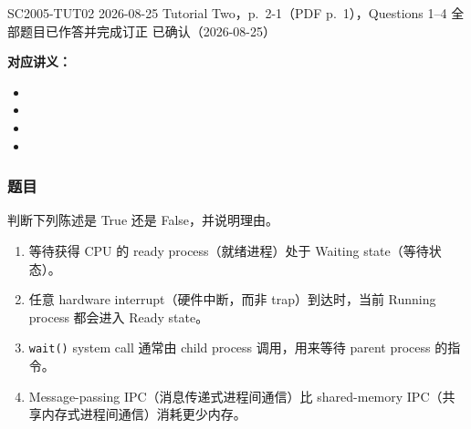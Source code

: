 
\label{tutorial:SC2005-TUT02}

\tutorialmeta
  {SC2005-TUT02}
  {2026-08-25}
  {Tutorial Two，p.~2-1（PDF p.~1），Questions 1--4}
  {全部题目已作答并完成订正}
  {已确认（2026-08-25）}


\textbf{对应讲义：}
\begin{itemize}[leftmargin=2em]
  \item {}
  \item {}
  \item {}
  \item {}
\end{itemize}

\subsubsection*{题目}

判断下列陈述是 True 还是 False，并说明理由。

\begin{enumerate}[label=(\alph*)]
  \item 等待获得 CPU 的 ready process（就绪进程）处于 Waiting state（等待状态）。
  \item 任意 hardware interrupt（硬件中断，而非 trap）到达时，当前 Running process 都会进入 Ready state。
  \item \texttt{wait()} system call 通常由 child process 调用，用来等待 parent process 的指令。
  \item Message-passing IPC（消息传递式进程间通信）比 shared-memory IPC（共享内存式进程间通信）消耗更少内存。
\end{enumerate}

